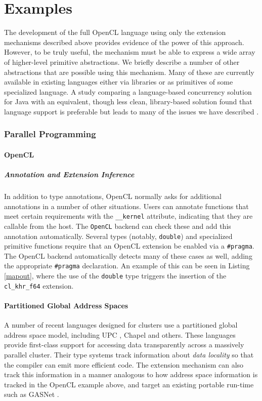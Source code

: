 \documentclass[9pt,preprint]{sigplanconf}
\begin{document}
\section{Examples}\label{examples}
The development of the full OpenCL language using only the extension mechanisms described above provides evidence of the power of this approach. However, to be truly useful, the mechanism must be able to express a wide array of higher-level primitive abstractions. We briefly describe a number of other abstractions that are possible using this mechanism. Many of these are currently available in existing languages either via libraries or as primitives of some specialized language. A study comparing a language-based concurrency solution for Java with an equivalent, though less clean, library-based solution found that language support is preferable but leads to many of the issues we have described \cite{cave2010comparing}.

\subsubsection{Parallel Programming}
\paragraph{OpenCL}
\subparagraph{Annotation and Extension Inference}
In addition to type annotations, OpenCL normally asks for additional annotations in a number of other situations.  Users can annotate functions that meet certain requirements  with the \verb|__kernel| attribute, indicating that they are callable from the host. The \verb|OpenCL| backend can check these and add this annotation automatically. Several types (notably, \verb|double|) and specialized primitive functions require that an OpenCL extension be enabled via a \verb|#pragma|. The OpenCL backend automatically detects many of these cases as well, adding the appropriate \verb|#pragma| declaration. An example of this can be seen in Listing \ref{mapout}, where the use of the \verb|double| type triggers the insertion of the \verb|cl_khr_f64| extension.

\paragraph{Partitioned Global Address Spaces}
A number of recent languages designed for clusters use a partitioned global address space model, including UPC \cite{upc}, Chapel \cite{chapel} and others. These languages provide first-class support for accessing data transparently across a massively parallel cluster. Their type systems track information about \emph{data locality} so that the compiler can emit more efficient code. The extension mechanism can also track this information in a manner analogous to how address space information is tracked in the OpenCL example above, and target an existing portable run-time such as GASNet \cite{bonachea2002gasnet}.
\end{document}

